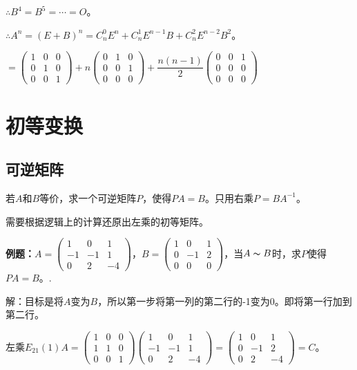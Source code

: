 \documentclass[UTF8, 12pt]{ctexart}
\begin{document}
$\therefore B^4=B^5=\cdots=O$。

$\therefore A^n=(E+B)^n=C_n^0E^n+C_n^1E^{n-1}B+C_n^2E^{n-2}B^2$。\medskip

$=\left(\begin{array}{ccc}
    1 & 0 & 0 \\
    0 & 1 & 0 \\
    0 & 0 & 1
\end{array}\right)+n\left(\begin{array}{ccc}
    0 & 1 & 0 \\
    0 & 0 & 1 \\
    0 & 0 & 0
\end{array}\right)+\dfrac{n(n-1)}{2}\left(\begin{array}{ccc}
    0 & 0 & 1 \\
    0 & 0 & 0 \\
    0 & 0 & 0
\end{array}\right)$

\section{初等变换}

\subsection{可逆矩阵}

若$A$和$B$等价，求一个可逆矩阵$P$，使得$PA=B$。只用右乘$P=BA^{-1}$。

需要根据逻辑上的计算还原出左乘的初等矩阵。\medskip

\textbf{例题：}$A=\left(\begin{array}{ccc}
    1 & 0 & 1 \\
    -1 & -1 & 1 \\
    0 & 2 & -4
\end{array}\right)$，$B=\left(\begin{array}{ccc}
    1 & 0 & 1 \\
    0 & -1 & 2 \\
    0 & 0 & 0
\end{array}\right)$，当$A\thicksim B$时，求$P$使得$PA=B$。.

解：目标是将$A$变为$B$，所以第一步将第一列的第二行的-1变为0。即将第一行加到第二行。

左乘$E_{21}(1)A=\left(\begin{array}{ccc}
    1 & 0 & 0 \\
    1 & 1 & 0 \\
    0 & 0 & 1
\end{array}\right)\left(\begin{array}{ccc}
    1 & 0 & 1 \\
    -1 & -1 & 1 \\
    0 & 2 & -4
\end{array}\right)=\left(\begin{array}{ccc}
    1 & 0 & 1 \\
    0 & -1 & 2 \\
    0 & 2 & -4
\end{array}\right)=C$。\medskip
\end{document}
